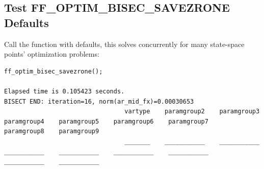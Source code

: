 \documentclass[
]{book}
\begin{document}
\hypertarget{test-ff_optim_bisec_savezrone-defaults}{%
\subsection{Test FF\_OPTIM\_BISEC\_SAVEZRONE Defaults}\label{test-ff_optim_bisec_savezrone-defaults}}

Call the function with defaults, this solves concurrently for many
state-space points' optimization problems:

\begin{verbatim}
ff_optim_bisec_savezrone();

Elapsed time is 0.105423 seconds.
BISECT END: iteration=16, norm(ar_mid_fx)=0.00030653
                                 vartype    paramgroup2    paramgroup3    paramgroup4    paramgroup5    paramgroup6    paramgroup7    paramgroup8    paramgroup9
                                 _______    ___________    ___________    ___________    ___________    ___________    ___________    ___________    ___________


\end{verbatim}
\end{document}
